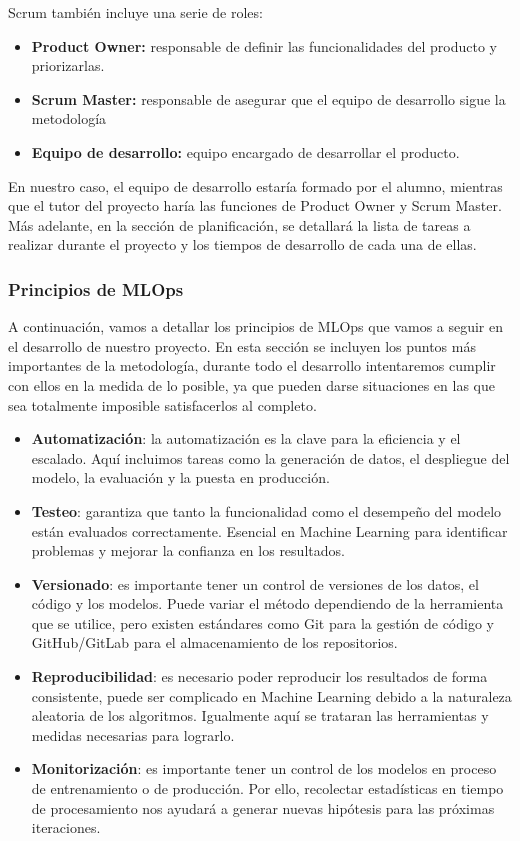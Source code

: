 Scrum también incluye una serie de roles:
\begin{itemize}
      \item \textbf{Product Owner:} responsable de definir las funcionalidades del producto y priorizarlas.
      \item \textbf{Scrum Master:} responsable de asegurar que el equipo de desarrollo sigue la metodología
      \item \textbf{Equipo de desarrollo:} equipo encargado de desarrollar el producto. 
\end{itemize}

En nuestro caso, el equipo de desarrollo estaría formado por el alumno, mientras que el tutor del proyecto
haría las funciones de Product Owner y Scrum Master. Más adelante, en la sección de planificación, se detallará
la lista de tareas a realizar durante el proyecto y los tiempos de desarrollo de cada una de ellas.

\subsubsection{Principios de MLOps}
A continuación, vamos a detallar los principios de MLOps que vamos a seguir en el desarrollo de nuestro proyecto.
En esta sección se incluyen los puntos más importantes de la metodología, durante todo el desarrollo intentaremos
cumplir con ellos en la medida de lo posible, ya que pueden darse situaciones en las que sea totalmente imposible
satisfacerlos al completo.

\begin{itemize}
    \item \textbf{Automatización}: la automatización es la clave para la eficiencia y el escalado.
          Aquí incluimos tareas como la generación de datos, el despliegue del modelo, la evaluación y
          la puesta en producción.
    \item \textbf{Testeo}: garantiza que tanto la funcionalidad como el desempeño del modelo están evaluados correctamente.
          Esencial en Machine Learning para identificar problemas y mejorar la confianza en los resultados.
    \item \textbf{Versionado}: es importante tener un control de versiones de los datos, el código y los modelos.
          Puede variar el método dependiendo de la herramienta que se utilice, pero existen estándares como Git para la gestión
          de código y GitHub/GitLab para el almacenamiento de los repositorios.
    \item \textbf{Reproducibilidad}: es necesario poder reproducir los resultados de forma consistente, puede ser
          complicado en Machine Learning debido a la naturaleza aleatoria de los algoritmos. Igualmente aquí se trataran
          las herramientas y medidas necesarias para lograrlo.
    \item \textbf{Monitorización}: es importante tener un control de los modelos en proceso de entrenamiento o de producción.
          Por ello, recolectar estadísticas en tiempo de procesamiento nos ayudará a generar nuevas hipótesis para las próximas 
          iteraciones.
\end{itemize}

